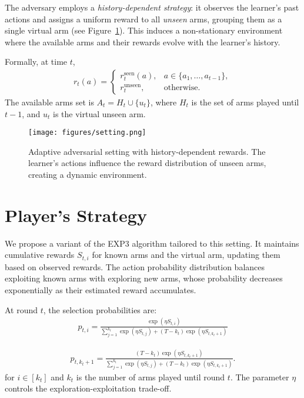 \documentclass[10pt,twocolumn]{article}
\begin{document}
The adversary employs a \emph{history-dependent strategy}: it observes the learner’s past actions and assigns a uniform reward to all \emph{unseen} arms, grouping them as a single virtual arm (see Figure~\ref{fig:setting}). This induces a non-stationary environment where the available arms and their rewards evolve with the learner’s history.

Formally, at time $t$,
\begin{align*}
    r_t(a) =
    \begin{cases}
        r_t^{\text{seen}}(a), & a \in \{a_1, \ldots, a_{t-1}\}, \\
        r_t^{\text{unseen}},  & \text{otherwise}.
    \end{cases}
\end{align*}
The available arms set is $A_t = H_t \cup \{u_t\}$, where $H_t$ is the set of arms played until $t-1$, and $u_t$ is the virtual unseen arm.

\begin{figure}[t]
    \centering
    \texttt{[image: figures/setting.png]}
    \caption{Adaptive adversarial setting with history-dependent rewards. The learner's actions influence the reward distribution of unseen arms, creating a dynamic environment.}
    \label{fig:setting}
\end{figure}
\section{Player's Strategy}

We propose a variant of the EXP3 algorithm tailored to this setting. It maintains cumulative rewards $S_{t,i}$ for known arms and the virtual arm, updating them based on observed rewards. The action probability distribution balances exploiting known arms with exploring new arms, whose probability decreases exponentially as their estimated reward accumulates.

At round $t$, the selection probabilities are:
\begin{align*}
    p_{t,i} = \frac{\exp(\eta S_{t,i})}{\sum_{j=1}^{k_t} \exp(\eta S_{t,j}) + (T-k_t)\exp(\eta S_{t,k_t+1})}
\end{align*}

\begin{align*}
    p_{t,k_t+1} = \frac{(T - k_t) \exp(\eta S_{t,k_t+1})}{\sum_{j=1}^{k_t} \exp(\eta S_{t,j}) + (T-k_t) \exp(\eta S_{t,k_t+1})}.
\end{align*}
for $i \in [k_t]$ and $k_t$ is the number of arms played until round $t$. The parameter $\eta$ controls the exploration-exploitation trade-off.
\end{document}
